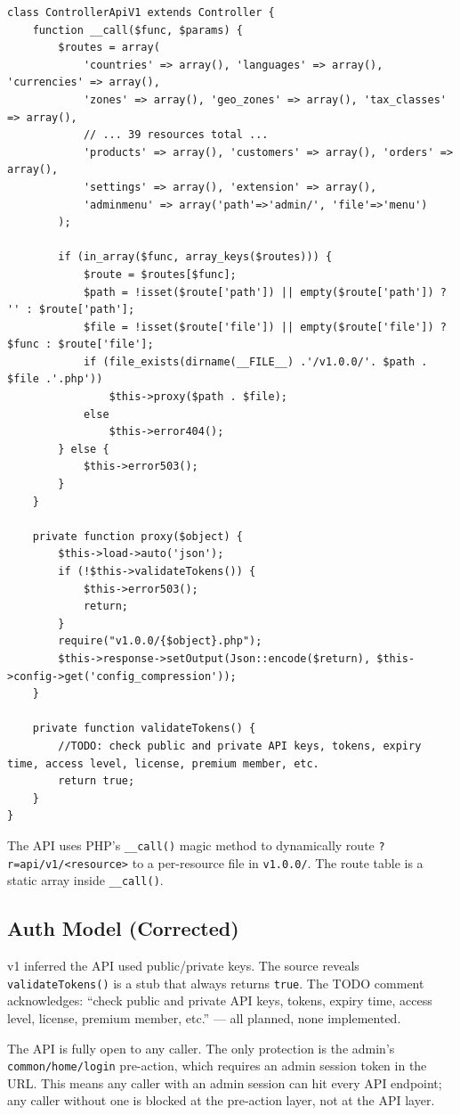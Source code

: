 \documentclass[11pt,a4paper]{article}
\begin{document}
\begin{lstlisting}[caption={\texttt{app/admin/controller/api/v1.php} --- the API router (abridged).},label={lst:api-router}]
class ControllerApiV1 extends Controller {
    function __call($func, $params) {
        $routes = array(
            'countries' => array(), 'languages' => array(), 'currencies' => array(),
            'zones' => array(), 'geo_zones' => array(), 'tax_classes' => array(),
            // ... 39 resources total ...
            'products' => array(), 'customers' => array(), 'orders' => array(),
            'settings' => array(), 'extension' => array(),
            'adminmenu' => array('path'=>'admin/', 'file'=>'menu')
        );

        if (in_array($func, array_keys($routes))) {
            $route = $routes[$func];
            $path = !isset($route['path']) || empty($route['path']) ? '' : $route['path'];
            $file = !isset($route['file']) || empty($route['file']) ? $func : $route['file'];
            if (file_exists(dirname(__FILE__) .'/v1.0.0/'. $path . $file .'.php'))
                $this->proxy($path . $file);
            else
                $this->error404();
        } else {
            $this->error503();
        }
    }

    private function proxy($object) {
        $this->load->auto('json');
        if (!$this->validateTokens()) {
            $this->error503();
            return;
        }
        require("v1.0.0/{$object}.php");
        $this->response->setOutput(Json::encode($return), $this->config->get('config_compression'));
    }

    private function validateTokens() {
        //TODO: check public and private API keys, tokens, expiry time, access level, license, premium member, etc.
        return true;
    }
}
\end{lstlisting}

The API uses PHP's \texttt{\_\_call()} magic method to dynamically
route \texttt{?r=api/v1/<resource>} to a per-resource file in
\texttt{v1.0.0/}. The route table is a static array inside
\texttt{\_\_call()}.

\subsection{Auth Model (Corrected)}

\begin{correctionbox}
v1 inferred the API used public/private keys. The source reveals
\texttt{validateTokens()} is a stub that always returns \texttt{true}.
The TODO comment acknowledges: ``check public and private API keys,
tokens, expiry time, access level, license, premium member, etc.''
--- all planned, none implemented.

The API is fully open to any caller. The only protection is the
admin's \texttt{common/home/login} pre-action, which requires an
admin session token in the URL. This means any caller with an
admin session can hit every API endpoint; any caller without one
is blocked at the pre-action layer, not at the API layer.
\end{correctionbox}
\end{document}
